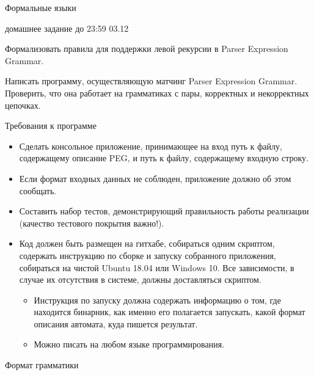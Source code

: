 \documentclass[12pt]{article}
\begin{document}
\begin{center} 
{\LARGE Формальные языки}

{\Large домашнее задание до 23:59 03.12}
\end{center}

\begin{enumerate}
{
   \item { Формализовать правила для поддержки левой рекурсии в Parser Expression Grammar. }
   
   \item { Написать программу, осуществляющую матчинг Parser Expression Grammar. Проверить, что она работает на грамматиках с пары, корректных и некорректных цепочках. }
}
\end{enumerate}


\begin{center} Требования к программе \end{center}

\begin{itemize}
    \item Сделать консольное  приложение, принимающее на вход путь к файлу, содержащему описание PEG, и путь к файлу, содержащему входную строку.
    \item Если формат входных данных не соблюден, приложение должно об этом сообщать. 
    \item Составить набор тестов, демонстрирующий правильность работы реализации (качество тестового покрытия важно!).
    \item Код должен быть размещен на гитхабе, собираться одним скриптом, содержать инструкцию по сборке и запуску собранного приложения, собираться на чистой Ubuntu 18.04 или Windows 10. Все зависимости, в случае их отсутствия в системе, должны доставляться скриптом.
    \begin{itemize}
        \item Инструкция по запуску должна содержать информацию о том, где находится бинарник, как именно его полагается запускать, какой формат описания автомата, куда пишется результат.
        \item Можно писать на любом языке программирования. 
    \end{itemize} 
\end{itemize}

\begin{center} Формат грамматики \end{center}
\end{document}

